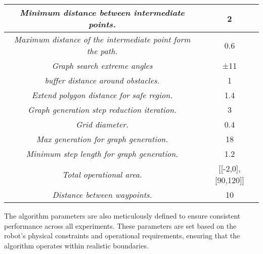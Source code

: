 \begin{table}[]
\begin{tabular}{|c|c|}
    \rowcolor[HTML]{CBF9FC} 
    \textit{Minimum distance between intermediate points.}                          & 2                              \\ \hline
    \rowcolor[HTML]{CBF9FC} 
    \textit{Maximum distance of the intermediate point form the path.}              & 0.6                            \\ \hline
    \rowcolor[HTML]{CBF9FC} 
    \textit{Graph search extreme angles}                                            & ±11                            \\ \hline
    \rowcolor[HTML]{CBF9FC} 
    \textit{buffer distance around obstacles.}                                      & 1                              \\ \hline
    \rowcolor[HTML]{CBF9FC} 
    \textit{Extend polygon distance for safe region.}                               & 1.4                            \\ \hline
    \rowcolor[HTML]{CBF9FC} 
    \textit{Graph generation step reduction iteration.}                             & 3                              \\ \hline
    \rowcolor[HTML]{CBF9FC} 
    \textit{Grid diameter.}                                                         & 0.4                            \\ \hline
    \rowcolor[HTML]{CBF9FC} 
    \textit{Max generation for graph generation.}                                   & 18                             \\ \hline
    \rowcolor[HTML]{CBF9FC} 
    \textit{Minimum step length for graph generation.}                              & 1.2                            \\ \hline
    \rowcolor[HTML]{CBF9FC} 
    \textit{Total operational area.}                                                & {[}{[}-2,0{]}, {[}90,120{]}{]} \\ \hline
    \rowcolor[HTML]{CBF9FC} 
    \textit{Distance between waypoints.}                                            & 10                             \\ \hline
    \end{tabular}
    \end{table}


\vspace*{6mm}  

The algorithm parameters are also meticulously defined to ensure consistent performance across all experiments. These parameters are set based on the robot's physical constraints and operational requirements, ensuring that the algorithm operates within realistic boundaries.

